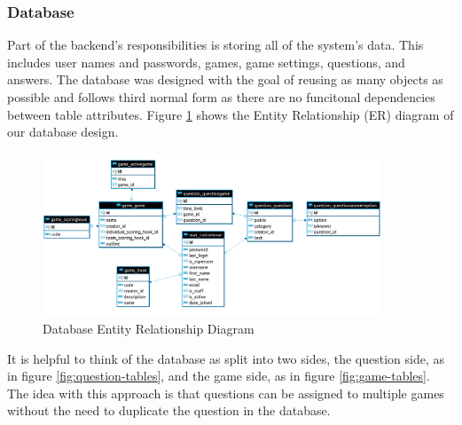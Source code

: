 \documentclass{article}
\begin{document}
		\subsubsection{Database}\label{database}
		Part of the backend's responsibilities is storing all of the system's data. This includes user names and passwords, games, game settings, questions, and answers. The database was designed with the goal of reusing as many objects as possible and follows third normal form as there are no funcitonal dependencies between table attributes. Figure \ref{fig:database-er_diagram} shows the Entity Relationship (ER) diagram of our database design.
		
        \begin{figure}[ht]
            \centering
            \includegraphics[width=0.9\textwidth]{images/database-er_diagram.png}
            \caption{Database Entity Relationship Diagram}
            \label{fig:database-er_diagram}
        \end{figure}
        
        It is helpful to think of the database as split into two sides, the question side, as in figure \ref{fig:question-tables}, and the game side, as in figure \ref{fig:game-tables}. The idea with this approach is that questions can be assigned to multiple games without the need to duplicate the question in the database.
        
\end{document}
